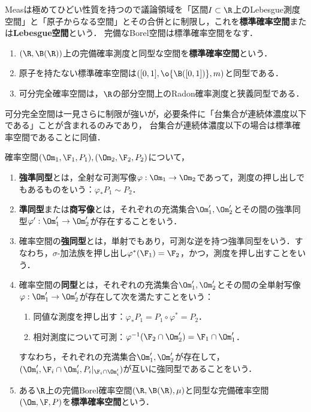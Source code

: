 \documentclass[uplatex,dvipdfmx]{jsreport}
\begin{document}
\begin{tcolorbox}[colframe=ForestGreen, colback=ForestGreen!10!white,breakable,colbacktitle=ForestGreen!40!white,coltitle=black,fonttitle=\bfseries\sffamily,
    title=議論領域を$\R$上の絶対連続分布と離散分布に限る]
    Measは極めてひどい性質を持つので議論領域を「区間$I\subset\R$上のLebesgue測度空間」と「原子からなる空間」とその合併とに制限し，これを\textbf{標準確率空間}または\textbf{Lebesgue空間}という．
    完備なBorel空間は標準確率空間をなす．
    \begin{enumerate}
        \item $(\R,\B(\R))$上の完備確率測度と同型な空間を\textbf{標準確率空間}という．
        \item 原子を持たない標準確率空間は$([0,1],\o{\B([0,1])},m)$と同型である．
        \item 可分完全確率空間は，$\R$の部分空間上のRadon確率測度と狭義同型である．
    \end{enumerate}
    可分完全空間は一見さらに制限が強いが，必要条件に「台集合が連続体濃度以下である」ことが含まれるのみであり，
    台集合が連続体濃度以下の場合は標準確率空間であることに同値．
\end{tcolorbox}

\begin{definition}
    確率空間$(\Om_1,\F_1,P_1),(\Om_2,\F_2,P_2)$について，
    \begin{enumerate}
        \item \textbf{強準同型}とは，全射な可測写像$\varphi:\Om_1\to\Om_2$であって，測度の押し出しでもあるものをいう：$\varphi_*P_1\sim P_2$．
        \item \textbf{準同型}または\textbf{商写像}とは，それぞれの充満集合$\Om'_1,\Om'_2$とその間の強準同型$\varphi':\Om'_1\to\Om'_2$が存在することをいう．
        \item 確率空間の\textbf{強同型}とは，単射でもあり，可測な逆を持つ強準同型をいう．すなわち，$\sigma$-加法族を押し出し$\varphi^*(\F_1)=\F_2$，かつ，測度を押し出すことをいう．
        \item 確率空間の\textbf{同型}とは，それぞれの充満集合$\Om'_1,\Om'_2$とその間の全単射写像$\varphi:\Om'_1\to\Om'_2$が存在して次を満たすことをいう：
        \begin{enumerate}
            \item 同値な測度を押し出す：$\varphi_*P_1=P_1\circ\varphi^*=P_2$．
            \item 相対測度について可測：$\varphi^{-1}(\F_2\cap\Om'_2)=\F_1\cap\Om'_1$．
        \end{enumerate}
        すなわち，それぞれの充満集合$\Om'_1,\Om'_2$が存在して，$(\Om'_i,\F_i\cap\Om'_i,P_i|_{\F_i\cap\Om'_i})$が互いに強同型であることをいう．
        \item ある$\R$上の完備Borel確率空間$(\R,\B(\R),\mu)$と同型な完備確率空間$(\Om,\F,P)$を\textbf{標準確率空間}という．
    \end{enumerate}
\end{definition}
\end{document}
